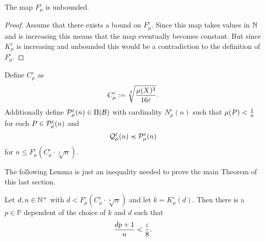 \begin{lemma}
  The map $F_\mu^\varepsilon$ is unbounded.
\end{lemma}

\begin{proof}
  Assume that there exists a bound on $F_\mu^\varepsilon$. Since this map takes values in $\N$ and is increasing this means that the map eventually becomes constant. But since $K_\mu^\varepsilon$ is increasing and unbounded this would be a contradiction to the definition of $F_\mu^\varepsilon$.
\end{proof}

\begin{defin}
  Define $C_\mu^\varepsilon$ as \[C_\mu^\varepsilon := \sqrt[3]{\mu(X)^2 \over 16\varepsilon}.\]
  Additionally define $\P^\varepsilon_\mu(n) \in \Pi(\mathcal{B})$ with cardinality $N_\mu^\varepsilon(n)$ such that $\mu(P) < {1 \over n}$ for each $P \in \P_\mu^\varepsilon(n)$ and \[\Q_\mu^\varepsilon(n) \preccurlyeq \P^\varepsilon_\mu(n)\] for $n \leq F_\mu^\varepsilon(C_\mu^\varepsilon \cdot \sqrt[3]{n})$. 
\end{defin}

The following Lemma is just an inequality needed to prove the main Theorem of this last section.
\begin{lemma}\label{lem:approxK}
  Let $d,n \in \N^+$ with $d < F_\mu^\varepsilon(C_\mu^\varepsilon \cdot \sqrt[3]{n})$ and let $k = K_\mu^\varepsilon(d)$. Then there is a $p \in \mathbb{P}$ dependent of the choice of $k$ and $d$ such that \[{dp +1 \over n} < {\varepsilon \over 8}.\]
\end{lemma}

